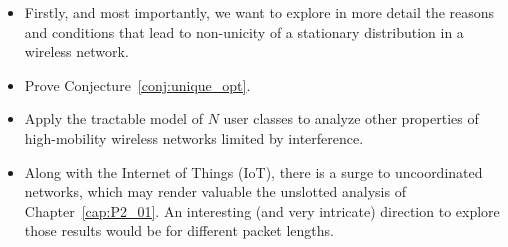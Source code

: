 \begin{itemize}
    \item Firstly, and most importantly, we want to explore in more detail the reasons and conditions that lead to non-unicity of a stationary distribution in a wireless network.
    
    \item Prove Conjecture~\ref{conj:unique_opt}.
    
    \item Apply the tractable model of $N$ user classes to analyze other properties of high-mobility wireless networks limited by interference.
    
    \item Along with the Internet of Things (IoT), there is a surge to uncoordinated networks, which may render valuable the unslotted analysis of Chapter~\ref{cap:P2_01}.
    An interesting (and very intricate) direction to explore those results would be for different packet lengths.
\end{itemize}
